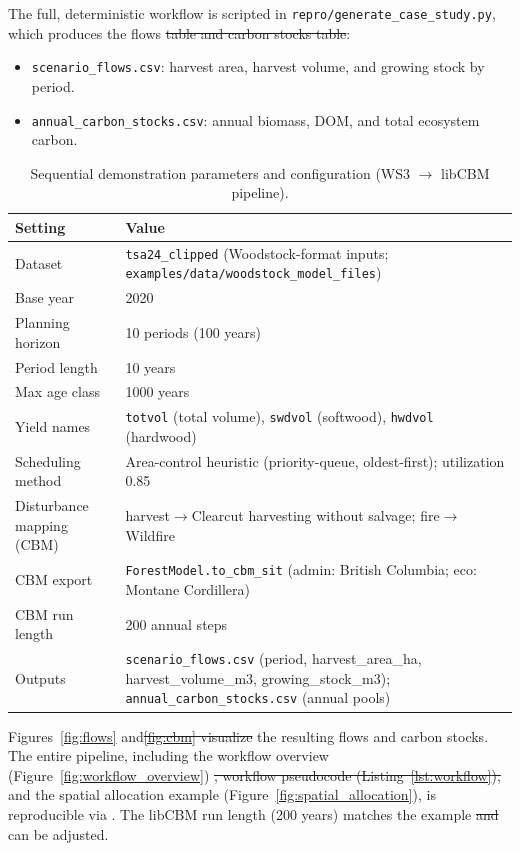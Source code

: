\documentclass[review]{elsarticle}
\providecommand{\DIFaddtex}[1]{{\protect\color{blue}\uwave{#1}}} %
\providecommand{\DIFdeltex}[1]{{\protect\color{red}\sout{#1}}}                      %
\providecommand{\DIFaddbegin}{} %
\providecommand{\DIFaddend}{} %
\providecommand{\DIFdelbegin}{} %
\providecommand{\DIFdelend}{} %
\providecommand{\DIFaddFL}[1]{\DIFadd{#1}} %
\providecommand{\DIFaddbeginFL}{} %
\providecommand{\DIFaddendFL}{} %
\providecommand{\DIFadd}[1]{\texorpdfstring{\DIFaddtex{#1}}{#1}} %
\providecommand{\DIFdel}[1]{\texorpdfstring{\DIFdeltex{#1}}{}} %
\newcommand{\DIFscaledelfig}{0.5}
\newlength{\DIFdelgraphicswidth} %
\newlength{\DIFdelgraphicsheight} %
\newcommand{\DIFaddincludegraphics}[2][]{{\color{blue}\fbox{\DIFOincludegraphics[#1]{#2}}}} %
\newcommand{\DIFdelincludegraphics}[2][]{%
\sbox{\DIFdelgraphicsbox}{\DIFOincludegraphics[#1]{#2}}%
\settoboxwidth{\DIFdelgraphicswidth}{\DIFdelgraphicsbox} %
\settoboxtotalheight{\DIFdelgraphicsheight}{\DIFdelgraphicsbox} %
\scalebox{\DIFscaledelfig}{%
\parbox[b]{\DIFdelgraphicswidth}{\usebox{\DIFdelgraphicsbox}\\[-\baselineskip] \rule{\DIFdelgraphicswidth}{0em}}\llap{\resizebox{\DIFdelgraphicswidth}{\DIFdelgraphicsheight}{%
\setlength{\unitlength}{\DIFdelgraphicswidth}%
\begin{picture}(1,1)%
\thicklines\linethickness{2pt} %
{\color[rgb]{1,0,0}\put(0,0){\framebox(1,1){}}}%
{\color[rgb]{1,0,0}\put(0,0){\line( 1,1){1}}}%
{\color[rgb]{1,0,0}\put(0,1){\line(1,-1){1}}}%
\end{picture}%
}\hspace*{3pt}}} %
} %
\DeclareRobustCommand{\DIFaddbegin}{\DIFOaddbegin \let\includegraphics\DIFaddincludegraphics} %
\DeclareRobustCommand{\DIFaddend}{\DIFOaddend \let\includegraphics\DIFOincludegraphics} %
\DeclareRobustCommand{\DIFdelbegin}{\DIFOdelbegin \let\includegraphics\DIFdelincludegraphics} %
\DeclareRobustCommand{\DIFdelend}{\DIFOaddend \let\includegraphics\DIFOincludegraphics} %
\DeclareRobustCommand{\DIFaddbeginFL}{\DIFOaddbeginFL \let\includegraphics\DIFaddincludegraphics} %
\DeclareRobustCommand{\DIFaddendFL}{\DIFOaddendFL \let\includegraphics\DIFOincludegraphics} %
\begin{document}
The full, deterministic workflow is scripted in \texttt{repro/generate\_case\_study.py}, which produces the flows \DIFdelbegin \DIFdel{table and carbon stocks table}\DIFdelend \DIFaddbegin \DIFadd{and carbon stock tables}\DIFaddend :
\begin{itemize}
  \item \texttt{scenario\_flows.csv}: harvest area, harvest volume, and growing stock by period.
  \item \texttt{annual\_carbon\_stocks.csv}: annual biomass, DOM, and total ecosystem carbon.
\end{itemize}
\begin{table}[h]
\centering
\caption{Sequential demonstration parameters and configuration (WS3 $\to$ libCBM pipeline).}
\begin{tabular}{p{4.2cm}p{9.5cm}}
\toprule
Setting & Value \\
\midrule
Dataset & \texttt{tsa24\_clipped} (Woodstock-format inputs; \texttt{examples/data/woodstock\_model\_files\DIFaddbeginFL \DIFaddFL{\_tsa24\_clipped}\DIFaddendFL }) \\
Base year & 2020 \\
Planning horizon & 10 periods (100 years) \\
Period length & 10 years \\
Max age class & 1000 years \\
Yield names & \texttt{totvol} (total volume), \texttt{swdvol} (softwood), \texttt{hwdvol} (hardwood) \\
Scheduling method & Area-control heuristic (priority-queue, oldest-first); utilization 0.85 \\
Disturbance mapping (CBM) & harvest$\to$Clearcut harvesting without salvage; fire$\to$Wildfire \\
CBM export & \texttt{ForestModel.to\_cbm\_sit} (admin: British Columbia; eco: Montane Cordillera) \\
CBM run length & 200 annual steps \\
Outputs & \texttt{scenario\_flows.csv} (period, harvest\_area\_ha, harvest\_volume\_m3, growing\_stock\_m3); \texttt{annual\_carbon\_stocks.csv} (annual pools) \\
\bottomrule
\end{tabular}
\label{tab:case_params}
\end{table}

Figures~\ref{fig:flows} and\DIFdelbegin \DIFdel{\ref{fig:cbm} visualize }\DIFdelend \DIFaddbegin \DIFadd{~\ref{fig:cbm} show }\DIFaddend the resulting flows and carbon stocks. The entire pipeline, including the workflow overview (Figure~\ref{fig:workflow_overview}) \DIFdelbegin \DIFdel{, workflow pseudocode (Listing~\ref{lst:workflow}), }\DIFdelend and the spatial allocation example (Figure~\ref{fig:spatial_allocation}), is reproducible via . The libCBM run length (200 years) matches the example \DIFdelbegin \DIFdel{and }\DIFdelend \DIFaddbegin \DIFadd{but }\DIFaddend can be adjusted.
\end{document}
